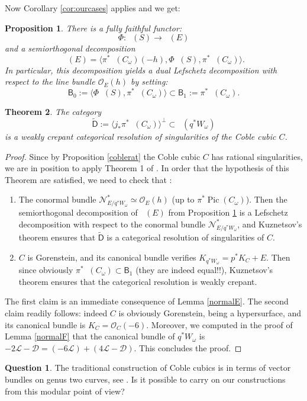 \documentclass[JEP,XML,SOM,Unicode,NoEqCountersInSection]{cedram}
\let\mathcal\mathscr
\theoremstyle{plain}
\newtheorem{theorem}{Theorem}\newtheorem*{theorem*}{Theorem}
\newtheorem{prop}[theorem]{Proposition}
\theoremstyle{definition}
\newtheorem*{question*}{Question}
\newcommand{\cat}[1]{\mathsf{#1}}
\newcommand{\sod}[1]{\langle #1 \rangle}
\DeclareMathOperator{\Db}{{\cat{D}^{\mathrm{b}}}}
\DeclareMathOperator{\Pic}{Pic}
\newcommand{\sheaf}[1]{\mathcal{#1}}
\newcommand{\kd}{\sheaf{D}}
\newcommand{\kl}{\sheaf{L}}
\newcommand{\kn}{\sheaf{N}}
\newcommand{\ko}{\sheaf{O}}\let\OO\ko\let\cO\ko
\begin{document}
Now Corollary \ref{cor:ourcases} applies and we get:

\begin{prop}\label{sodComega}
There is a fully faithful functor:
\[
\Phi: \Db(S) \to \Db(E)
\]
and a semiorthogonal decomposition
\[
\Db(E) = \sod{\pi^*\Db(C_\omega)(-h),\Phi\Db(S),\pi^* \Db(C_\omega)}.
\]
In particular, this decomposition yields a dual Lefschetz decomposition with respect to the line
bundle $\ko_E(h)$ by setting:
\[
\cat{B}_0:=\sod{\Phi\Db(S),\pi^*\Db(C_\omega)} \subset \cat{B}_{1}:=\pi^*\Db(C_\omega).
\]
\end{prop}

\begin{theorem}\label{weakly-crepant}
The category
\[
\tilde{\cat{D}}:= \sod{j_*\pi^* \Db(C_\omega)}^\perp \subset \Db(q^*W_\omega)
\]
is a weakly crepant categorical resolution of singularities of the Coble cubic $C$.
\end{theorem}

\begin{proof}
Since by Proposition \ref{coblerat} the Coble cubic $C$ has rational singularities, we are
in position to apply Theorem 1 of \cite{kuz-lefschetz}. In order that the hypothesis of
this Theorem are satisfied, we need to check that :
\begin{enumerate}
\item The conormal bundle $\kn_{E/q^* W_\omega}^*\simeq \ko_E(h)$
(up to $\pi^*\Pic(C_\omega)$). Then the semiorthogonal decomposition of $\Db(E)$ from Proposition \ref{sodComega} is a Lefschetz decomposition with respect to the conormal bundle $\kn_{E/q^*W_\omega}^*$, and Kuznetsov's theorem ensures
that $\tilde{\cat{D}}$ is a categorical resolution
of singularities of $C$.
\item $C$ is Gorenstein, and its canonical bundle verifies $K_{q^*W_\omega}=p^*K_C + E$. Then
since obviously $\pi^* \Db(C_\omega) \subset\cat{B}_1$ (they are indeed equal!!),
Kuznetsov's theorem ensures that the categorical resolution is weakly crepant.
\end{enumerate}
The first claim is an immediate consequence of Lemma \ref{normalE}.
The second claim readily follows: indeed
$C$ is obviously Gorenstein, being a hypersurface, and its
canonical bundle is $K_C=\ko_C(-6)$. Moreover, we computed in the proof of Lemma
\ref{normalF} that the canonical bundle of $q^*W_\omega$ is $-2\kl-\kd=(-6\kl)+(4\kl-\kd)$.
This concludes the proof.
\end{proof}

\begin{question*}
The traditional construction of Coble cubics is in terms of
vector bundles on genus two curves, see \cite{beauville-coble}. Is it possible to carry on our constructions
from this modular point of view?
\end{question*}
\end{document}
